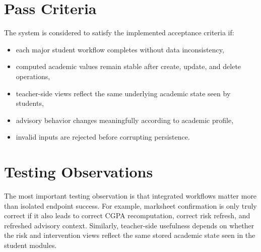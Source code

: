 \section{Pass Criteria}
The system is considered to satisfy the implemented acceptance criteria if:
\begin{itemize}[leftmargin=*]
\item each major student workflow completes without data inconsistency,
\item computed academic values remain stable after create, update, and delete operations,
\item teacher-side views reflect the same underlying academic state seen by students,
\item advisory behavior changes meaningfully according to academic profile,
\item invalid inputs are rejected before corrupting persistence.
\end{itemize}

\section{Testing Observations}
The most important testing observation is that integrated workflows matter more than isolated endpoint success. For example, marksheet confirmation is only truly correct if it also leads to correct CGPA recomputation, correct risk refresh, and refreshed advisory context. Similarly, teacher-side usefulness depends on whether the risk and intervention views reflect the same stored academic state seen in the student modules.
